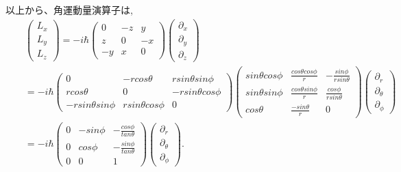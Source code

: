 \documentclass[11pt,a4paper]{jsarticle}
\begin{document}
以上から、角運動量演算子は, 
\begin{eqnarray}
&&\left( \begin{array}{c} L_x \\ L_y \\ L_z \end{array} \right) = -i\hbar \left( \begin{array}{ccc} 0&-z &y \\ z & 0&-x \\ -y &x &0\end{array} \right) \left( \begin{array}{c} \partial_x \\ \partial_y \\ \partial_z \end{array} \right) \nonumber \\
&&= -i\hbar \left( \begin{array}{ccc} 0 & -rcos\theta  & rsin\theta sin\phi \\ rcos\theta  & 0 &-rsin\theta cos\phi \\ -rsin\theta  sin\phi &rsin\theta cos\phi &0\end{array} \right) \left(\begin{array}{ccc} sin\theta cos\phi & \frac{cos\theta cos\phi}{r} &- \frac{sin\phi}{rsin\theta } \\ sin\theta sin\phi & \frac{cos\theta sin\phi}{r} & \frac{cos\phi}{rsin\theta }\\ cos\theta  & \frac{-sin\theta }{r} & 0 \end{array} \right) \left( \begin{array}{c} \partial_r \\ \partial_\theta \\ \partial_\phi \end{array} \right) \nonumber \\
&&= -i\hbar \left(\begin{array}{ccc} 0 & -sin\phi &- \frac{cos\phi}{tan\theta } \\ 0 & cos\phi & - \frac{sin\phi}{tan\theta }\\ 0 & 0& 1 \end{array} \right) \left( \begin{array}{c} \partial_r \\ \partial_\theta \\ \partial_\phi \end{array} \right) .
\end{eqnarray}
\end{document}
